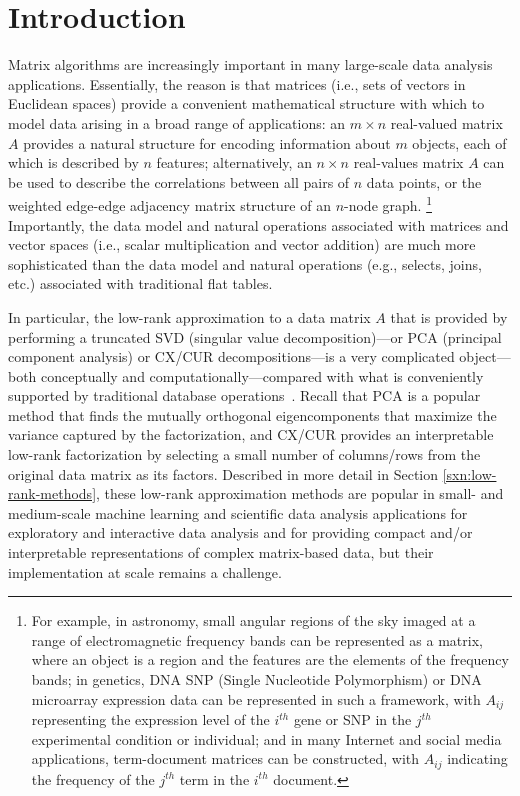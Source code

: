 \section{Introduction}

Matrix algorithms are increasingly important in many large-scale data analysis applications.  
Essentially, the reason is that matrices (i.e., sets of vectors in Euclidean spaces) provide a convenient mathematical structure with which to model data arising in a broad range of applications:
an $m \times n$ real-valued matrix $A$ provides a natural structure for
encoding information about $m$ objects, each of which is described by $n$
features;
alternatively, an $n \times n$ real-values matrix $A$ can be used to describe
the correlations between all pairs of $n$ data points, or the weighted
edge-edge adjacency matrix structure of an $n$-node graph.%
\footnote{For example, in astronomy, small angular regions of the sky imaged at a range of electromagnetic frequency bands can be represented as a matrix, where an object is a region and the features are the elements of the frequency bands;
in genetics, DNA SNP (Single Nucleotide Polymorphism) or DNA microarray expression data can be represented in such a framework, with $A_{ij}$ representing the expression level of the $i^{th}$ gene or SNP in the $j^{th}$ experimental condition or individual; and
in many Internet and social media applications, term-document matrices can be constructed, with $A_{ij}$ indicating the frequency of the $j^{th}$ term in the $i^{th}$ document.}
Importantly, the data model and natural operations associated with matrices and vector spaces (i.e., scalar multiplication and vector addition) are much more sophisticated than the data model and natural operations (e.g., selects, joins, etc.) associated with traditional flat tables.

In particular, the low-rank approximation to a data matrix $A$ that is provided by performing a truncated SVD (singular value decomposition)---or PCA (principal component analysis) or CX/CUR decompositions---is a very complicated object---both conceptually and computationally---compared with what is conveniently supported by traditional database operations~\cite{Skillicorn07}.
Recall that PCA is a popular method that finds the mutually orthogonal eigencomponents that maximize the variance captured by the factorization, and CX/CUR provides an interpretable low-rank factorization by selecting a small number of columns/rows from the original data matrix as its factors.
Described in more detail in Section \ref{sxn:low-rank-methods}, these low-rank approximation methods are popular in small- and medium-scale machine learning and scientific data analysis applications for exploratory and interactive data analysis and for providing compact and/or interpretable representations of complex matrix-based data, but their implementation at scale remains a challenge.

